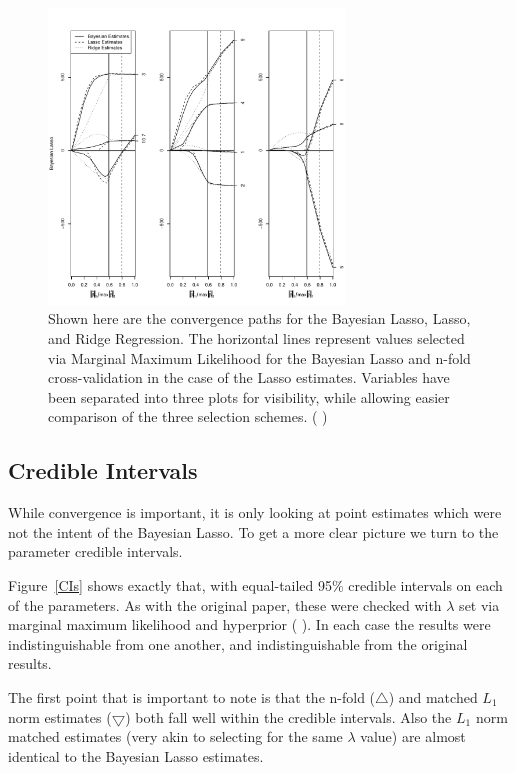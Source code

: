 \documentclass{uwstat572}
\newcommand{\vmcomment}[1]{({\color{blue}{VM's comment:}} \textbf{\color{blue}{#1}})}
\begin{document}
\begin{figure}\label{convergence}
  \centering
    \includegraphics[width=0.7\textwidth]{SaveFigure1.pdf}
  \caption{Shown here are the convergence paths for the Bayesian Lasso, Lasso, and Ridge Regression. The horizontal lines represent values selected via Marginal Maximum Likelihood for the Bayesian Lasso and n-fold cross-validation in the case of the Lasso estimates. Variables have been separated into three plots for visibility, while allowing easier comparison of the three selection schemes.  \vmcomment{Make all fonts bigger and make sure everything is readable. Also, axis labels do not make sense to me.}}
\end{figure}

\subsection{Credible Intervals}
While convergence is important, it is only looking at point estimates which were not the intent of the Bayesian Lasso. To get a more clear picture we turn to the parameter credible intervals. 

Figure~\ref{CIs} shows exactly that, with equal-tailed 95\% credible intervals on each of the parameters. As with the original paper, these were checked with $\lambda$ set via marginal maximum likelihood and hyperprior \vmcomment{Specify the hyperprior.}. 
In each case the results were indistinguishable from one another, and indistinguishable from the original results.

The first point that is important to note is that the n-fold ($\bigtriangleup$) and matched $L_1$ norm estimates ($\bigtriangledown$) both fall well within the credible intervals. Also the $L_1$ norm matched estimates (very akin to selecting for the same $\lambda$ value) are almost identical to the Bayesian Lasso estimates. 
\end{document}
